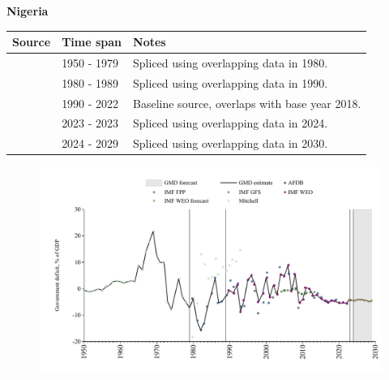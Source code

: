 \documentclass[12pt,a4paper,landscape]{article}
\begin{document}
\begin{adjustbox}{max totalsize={\paperwidth}{\paperheight},center}
\begin{minipage}[t][\textheight][t]{\textwidth}
\vspace*{0.5cm}
{}
\begin{center}
{\Large\bfseries Nigeria}
\end{center}
\vspace{0.5cm}
\begin{table}[H]
\centering
\small
\begin{tabular}{|l|l|l|}
\hline
\textbf{Source} & \textbf{Time span} & \textbf{Notes} \\
\hline
\rowcolor{white}\cite{Mitchell}& 1950 - 1979 &Spliced using overlapping data in 1980.\\
\rowcolor{lightgray}\cite{AFDB}& 1980 - 1989 &Spliced using overlapping data in 1990.\\
\rowcolor{white}\cite{IMF_WEO}& 1990 - 2022 &Baseline source, overlaps with base year 2018.\\
\rowcolor{lightgray}\cite{IMF_FPP}& 2023 - 2023 &Spliced using overlapping data in 2024.\\
\rowcolor{white}\cite{IMF_WEO_forecast}& 2024 - 2029 &Spliced using overlapping data in 2030.\\
\hline
\end{tabular}
\end{table}
\begin{figure}[H]
\centering
\includegraphics[width=\textwidth,height=0.6\textheight,keepaspectratio]{graphs/NGA_govdef_GDP.pdf}
\end{figure}
\end{minipage}
\end{adjustbox}
\end{document}
